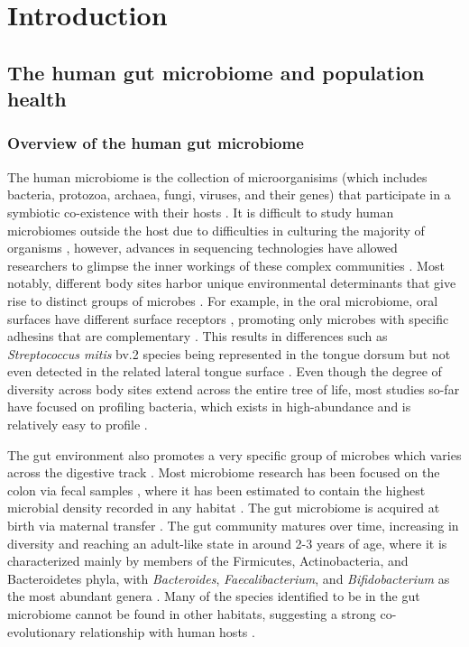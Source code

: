 \chapter{Introduction}

\section{The human gut microbiome and population health}
\subsection{Overview of the human gut microbiome}

The human microbiome is the collection of microorganisims (which includes bacteria, protozoa, archaea, fungi, viruses, and their genes) that participate in a symbiotic co-existence with their hosts \cite{ursell2012defining}. It is difficult to study human microbiomes outside the host due to difficulties in culturing the majority of organisms \cite{}, however, advances in sequencing technologies have allowed researchers to glimpse the inner workings of these complex communities \cite{}. Most notably, different body sites harbor unique environmental determinants that give rise to distinct groups of microbes \cite{consortium2012structure}. For example, in the oral microbiome, oral surfaces have different surface receptors \cite{gibbons1989bacterial}, promoting only microbes with specific adhesins that are complementary \cite{aas2005defining}. This results in differences such as \emph{Streptococcus mitis} bv.2 species being represented in the tongue dorsum but not even detected in the related lateral tongue surface \cite{aas2005defining}. Even though the degree of diversity across body sites extend across the entire tree of life, most studies so-far have focused on profiling bacteria, which exists in high-abundance and is relatively easy to profile \cite{}. 

The gut environment also promotes a very specific group of microbes which varies across the digestive track \cite{mailhe2018repertoire, donaldson2016gut}. Most microbiome research has been focused on the colon via fecal samples \cite{tang2020current}, where it has been estimated to contain the highest microbial density recorded in any habitat \cite{}. The gut microbiome is acquired at birth \cite{} via maternal transfer \cite{}. The gut community matures over time, increasing in diversity and reaching an adult-like state in around 2-3 years of age, where it is characterized mainly by members of the Firmicutes, Actinobacteria, and Bacteroidetes phyla, with \emph{Bacteroides}, \emph{Faecalibacterium}, and \emph{Bifidobacterium} as the most abundant genera \cite{king2019baseline, metahitconsortiumadditionalmembers2011enterotypes}. Many of the species identified to be in the gut microbiome cannot be found in other habitats, suggesting a strong co-evolutionary relationship with human hosts \cite{ley2006ecological}.  

